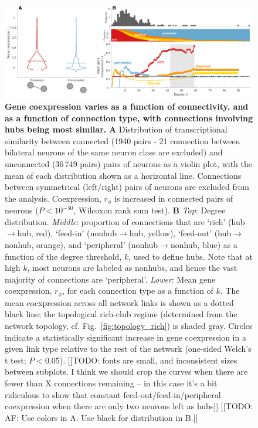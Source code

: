 \documentclass[10pt,letterpaper]{article}
\begin{document}
 \begin{figure}[h]
 \centering
    \includegraphics[width=1\textwidth]{MeanCoexpression.pdf}
 \caption{{\bf Gene coexpression varies as a function of connectivity, and as a function of connection type, with connections involving hubs being most similar.}
\textbf{A} Distribution of transcriptional similarity between connected (1940 pairs - 21 connection between bilateral neurons of the same neuron class are excluded) and unconnected (36\,749 pairs) pairs of neurons as a violin plot, with the mean of each distribution shown as a horizontal line. Connections between symmetrical (left/right) pairs of neurons are excluded from the analysis.
Coexpression, $r_\phi$ is increased in connected pairs of neurons ($P < 10^{-50}$, Wilcoxon rank sum test).
\textbf{B}
\emph{Top}: Degree distribution.
\emph{Middle}: proportion of connections that are `rich' (hub$\rightarrow$hub, red), `feed-in' (nonhub$\rightarrow$hub, yellow), `feed-out' (hub$\rightarrow$nonhub, orange), and `peripheral' (nonhub$\rightarrow$nonhub, blue) as a function of the degree threshold, $k$, used to define hubs.
Note that at high $k$, most neurons are labeled as nonhubs, and hence the vast majority of connections are `peripheral'.
\emph{Lower}: Mean gene coexpression, $r_\phi$, for each connection type as a function of $k$.
The mean coexpression across all network links is shown as a dotted black line; the topological rich-club regime (determined from the network topology, cf. Fig.~\ref{fig:topology_rich}) is shaded gray.
Circles indicate a statistically significant increase in gene coexpression in a given link type relative to the rest of the network (one-sided Welch’s t test; $P < 0.05$).
[[TODO: fonts are small, and inconsistent sizes between subplots.
I think we should crop the curves when there are fewer than X connections remaining -- in this case it's a bit ridiculous to show that constant feed-out/feed-in/peripheral coexpression when there are only two neurons
left as hubs]]
[[TODO: AF: Use colors in A. Use black for distribution in B.]]
}
 \label{fig:coExp}
\end{figure}
\end{document}
